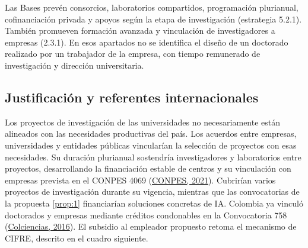 Las Bases prevén consorcios, laboratorios compartidos, programación plurianual, cofinanciación privada y apoyos según la etapa de investigación (estrategia 5.2.1). También promueven formación avanzada y vinculación de investigadores a empresas (2.3.1). En esos apartados no se identifica el diseño de un doctorado realizado por un trabajador de la empresa, con tiempo remunerado de investigación y dirección universitaria.

\subsection{Justificación y referentes internacionales}

Los proyectos de investigación de las universidades no necesariamente están alineados con las necesidades productivas del país. Los acuerdos entre empresas, universidades y entidades públicas vincularían la selección de proyectos con esas necesidades. Su duración plurianual sostendría investigadores y laboratorios entre proyectos, desarrollando la financiación estable de centros y su vinculación con empresas prevista en el CONPES 4069 (\hyperref[ref:bib:conpes4069_2021]{CONPES, 2021}). Cubrirían varios proyectos de investigación durante su vigencia, mientras que las convocatorias de la propuesta \ref{prop:1} financiarían soluciones concretas de IA. Colombia ya vinculó doctorados y empresas mediante créditos condonables en la Convocatoria 758 (\hyperref[ref:bib:colciencias758]{Colciencias, 2016}). El subsidio al empleador propuesto retoma el mecanismo de CIFRE, descrito en el cuadro siguiente. %

